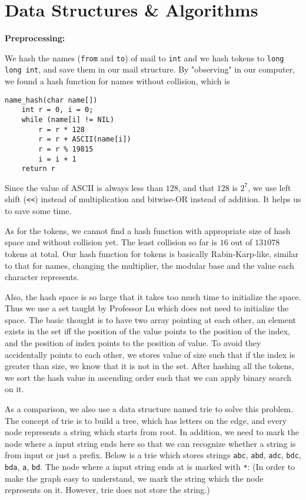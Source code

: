 \documentclass{article}
\begin{document}
\section*{Data Structures \& Algorithms}

\textbf{Preprocessing:}

We hash the names (\verb|from| and \verb|to|) of mail to \verb|int| and we hash tokens to \verb|long long int|, and save them in our mail structure. By "observing" in our computer, we found a hash function for names without collision, which is 
\begin{verbatim}
name_hash(char name[])
    int r = 0, i = 0;
    while (name[i] != NIL)
        r = r * 128
        r = r + ASCII(name[i])
        r = r % 19815
        i = i + 1
    return r
\end{verbatim}
Since the value of ASCII is always less than $128$, and that $128$ is $2^7$, we use left shift (\verb|<<|) instead of multiplication and bitwise-OR instead of addition. It helps us to save some time.

As for the tokens, we cannot find a hash function with appropriate size of hash space and without collision yet. The least collision so far is $16$ out of $131078$ tokens at total. Our hash function for tokens is basically Rabin-Karp-like, similar to that for names, changing the multiplier, the modular base and the value each character represents.

Also, the hash space is so large that it takes too much time to initialize the space. Thus we use a set taught by Professor Lu which does not need to initialize the space. The basic thought is to have two array pointing at each other, an element exists in the set iff the position of the value points to the position of the index, and the position of index points to the position of value. To avoid they accidentally points to each other, we stores value of size such that if the index is greater than size, we know that it is not in the set. After hashing all the tokens, we sort the hash value in ascending order such that we can apply binary search on it.

As a comparison, we also use a data structure named trie to solve this problem. The concept of trie is to build a tree, which has letters on the edge, and every node represents a string which starts from root. In addition, we need to mark the node where a input string ends here so that we can recognize whether a string is from input or just a prefix. Below is a trie which stores strings \verb|abc|, \verb|abd|, \verb|adc|, \verb|bdc|, \verb|bda|, \verb|a|, \verb|bd|. The node where a input string ends at is marked with \verb|*|: (In order to make the graph easy to understand, we mark the string which the node represents on it. However, trie does not store the string.)
\end{document}
